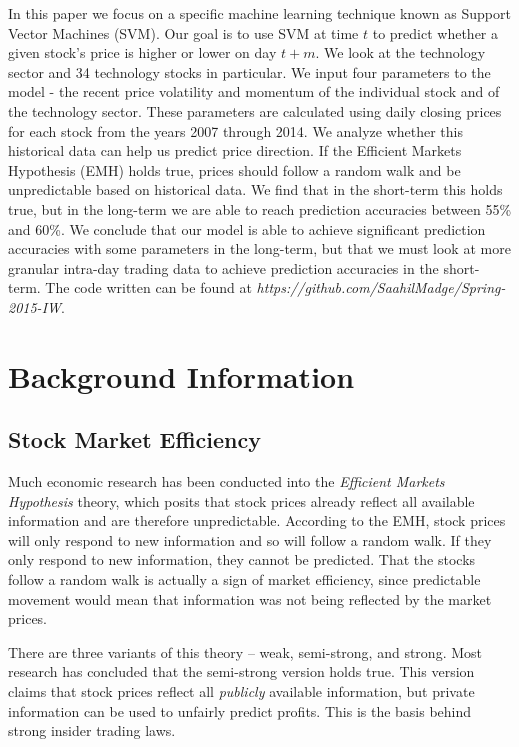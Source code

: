 \documentclass[pageno]{jpaper}
\begin{document}
In this paper we focus on a specific machine learning technique known as Support Vector Machines (SVM). Our goal is to use SVM at time $t$ to predict whether a given stock's price is higher or lower on day $t+m$. We look at the technology sector and 34 technology stocks in particular. We input four parameters to the model - the recent price volatility and momentum of the individual stock and of the technology sector. These parameters are calculated using daily closing prices for each stock from the years 2007 through 2014. We analyze whether this historical data can help us predict price direction. If the Efficient Markets Hypothesis (EMH) holds true, prices should follow a random walk and be unpredictable based on historical data. We find that in the short-term this holds true, but in the long-term we are able to reach prediction accuracies between 55\% and 60\%. We conclude that our model is able to achieve significant prediction accuracies with some parameters in the long-term, but that we must look at more granular intra-day trading data to achieve prediction accuracies in the short-term. The code written can be found at {\em https://github.com/SaahilMadge/Spring-2015-IW}.

\section{Background Information}
\subsection{Stock Market Efficiency}
\label{subsec: stock}
Much economic research has been conducted into the {\em Efficient Markets Hypothesis} theory, which posits that stock prices already reflect all available information \cite{bodie} and are therefore unpredictable. According to the EMH, stock prices will only respond to new information and so will follow a random walk. If they only respond to new information, they cannot be predicted. That the stocks follow a random walk is actually a sign of market efficiency, since predictable movement would mean that information was not being reflected by the market prices.

There are three variants of this theory -- weak, semi-strong, and strong. Most research has concluded that the semi-strong version holds true. This version claims that stock prices reflect all {\em publicly} available information, but private information can be used to unfairly predict profits. This is the basis behind strong insider trading laws.
\end{document}
